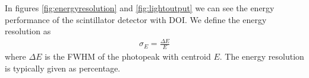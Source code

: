 In figures \ref{fig:energyresolution} and \ref{fig:lightoutput} we can see the energy performance of the scintillator detector with DOI. We define the energy resolution as
\begin{align}
\sigma_E = \frac{\Delta E}{E}
\end{align}
where $\Delta E$ is the FWHM of the photopeak with centroid $E$. The energy resolution is typically given as percentage.